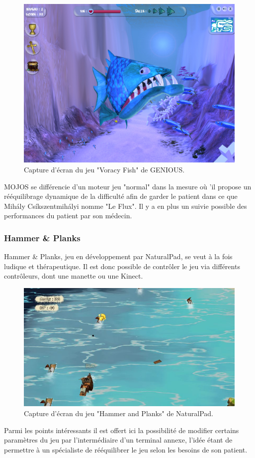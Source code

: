 \begin{figure}[h!]
\centering
\includegraphics[width=0.8\linewidth]{images/voracy_fish}
\caption{Capture d'écran du jeu "Voracy Fish" de GENIOUS.}
\label{fig:voracy_fish}
\end{figure}

MOJOS se différencie d'un moteur jeu "normal" dans la mesure où 'il propose
un rééquilibrage dynamique de la difficulté afin de garder le patient dans
ce que Mihály Csíkszentmihályi nomme "Le Flux"\cite{flow}. Il y a en plus un suivie possible 
des performances du patient par son médecin.

\subsubsection{Hammer \& Planks}
Hammer \& Planks, jeu en développement par NaturalPad, se veut à la fois 
ludique et thérapeutique. Il est donc possible de contrôler le jeu via différents contrôleurs, dont une manette ou une Kinect.

\begin{figure}[h!]
\centering
\includegraphics[width=1.0\linewidth]{images/hammer_and_planks}
\caption{Capture d'écran du jeu "Hammer and Planks" de 
NaturalPad.}
\end{figure}

Parmi les points intéressants il est offert ici la possibilité de modifier certains
paramètres du jeu par l'intermédiaire d'un terminal annexe, l'idée étant de
permettre à un spécialiste de rééquilibrer le jeu selon les besoins de son
patient.
